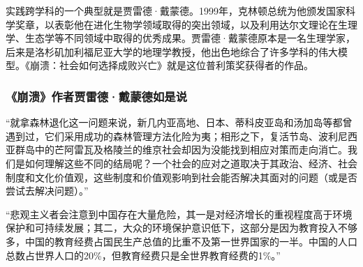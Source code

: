 实践跨学科的一个典型就是贾雷德·戴蒙德。1999年，克林顿总统为他颁发国家科学奖章，以表彰他在进化生物学领域取得的突出领域，以及利用达尔文理论在生理学、生态学等不同领域中取得的优秀成果。贾雷德·戴蒙德原本是一名生理学家，后来是洛杉矶加利福尼亚大学的地理学教授，他出色地综合了许多学科的伟大模型。《崩溃：社会如何选择成败兴亡》就是这位普利策奖获得者的作品。
\par

\subsubsection*{《崩溃》作者贾雷德·戴蒙德如是说}

“就拿森林退化这一问题来说，新几内亚高地、日本、蒂科皮亚岛和汤加岛等都曾遇到过，它们采用成功的森林管理方法化险为夷；相形之下，复活节岛、波利尼西亚群岛中的芒阿雷瓦及格陵兰的维京社会却因为没能找到相应对策而走向消亡。我们是如何理解这些不同的结局呢？一个社会的应对之道取决于其政治、经济、社会制度和文化价值观，这些制度和价值观影响到社会能否解决其面对的问题（或是否尝试去解决问题）。”
\par

“悲观主义者会注意到中国存在大量危险，其一是对经济增长的重视程度高于环境保护和可持续发展；其二，大众的环境保护意识低下，这部分是因为教育投入不够多，中国的教育经费占国民生产总值的比重不及第一世界国家的一半。中国的人口总数占世界人口的20\%，但教育经费只是全世界教育经费的1\%。”
\par
